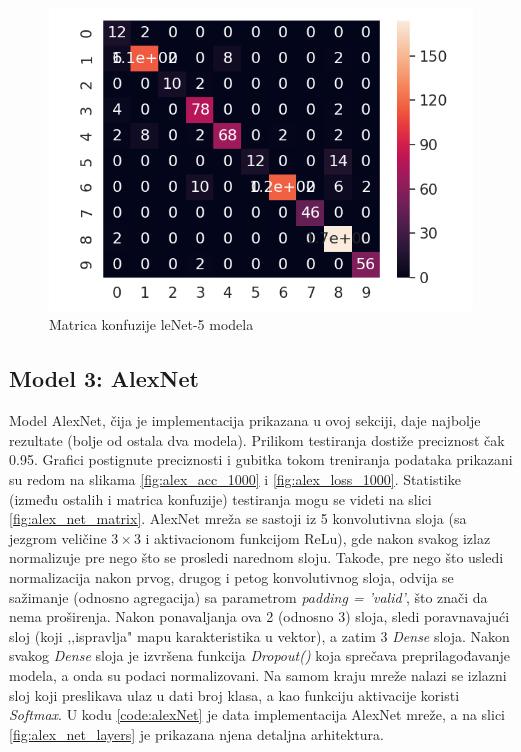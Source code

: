 \documentclass[a4paper]{article}
\begin{document}
\begin{figure}[h!]
\begin{center}
\includegraphics[scale=0.4]{confussion_matrix_1.png}
\end{center}
\caption{Matrica konfuzije leNet-5 modela}
\label{fig:confussion_matrix_1}
\end{figure}

\newpage

\subsection{Model 3: AlexNet}
\label{sec:model_3}
Model AlexNet, čija je implementacija prikazana u ovoj sekciji, daje najbolje rezultate (bolje od ostala dva modela). Prilikom testiranja dostiže preciznost čak 0.95. Grafici postignute preciznosti i gubitka tokom treniranja podataka prikazani su redom na slikama \ref{fig:alex_acc_1000} i \ref{fig:alex_loss_1000}. Statistike (između ostalih i matrica konfuzije) testiranja mogu se videti na slici \ref{fig:alex_net_matrix}.
AlexNet mreža se sastoji iz 5 konvolutivna sloja (sa jezgrom veličine $3\times3$ i aktivacionom funkcijom ReLu), gde nakon svakog izlaz normalizuje pre nego što se prosledi narednom sloju. Takođe, pre nego što usledi normalizacija nakon prvog, drugog i petog konvolutivnog sloja, odvija se sažimanje (odnosno agregacija) sa parametrom \textit{padding = 'valid'}, što znači da nema proširenja. Nakon ponavaljanja ova 2 (odnosno 3) sloja, sledi poravnavajući sloj (koji ‚‚ispravlja" mapu karakteristika u vektor), a zatim 3 \textit{Dense} sloja. Nakon svakog \textit{Dense} sloja je izvršena funkcija \textit{Dropout()} koja sprečava preprilagođavanje modela, a onda su podaci normalizovani. Na samom kraju mreže nalazi se izlazni sloj koji preslikava ulaz u dati broj klasa, a kao funkciju aktivacije koristi \textit{Softmax}. U kodu \ref{code:alexNet} je data implementacija AlexNet mreže, a na slici \ref{fig:alex_net_layers} je prikazana njena detaljna arhitektura.
\end{document}
